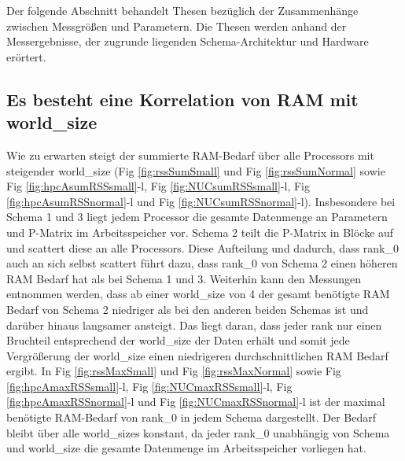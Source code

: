 Der folgende Abschnitt behandelt Thesen bezüglich der Zusammenhänge zwischen Messgrößen und Parametern.
Die Thesen werden anhand der Messergebnisse, der zugrunde liegenden Schema-Architektur und Hardware erörtert.

\subsection{Es besteht eine Korrelation von RAM mit world\_size}

Wie zu erwarten steigt der summierte RAM-Bedarf über alle Processors mit steigender world\_size
(Fig \ref{fig:rssSumSmall} und Fig \ref{fig:rssSumNormal} sowie Fig \ref{fig:hpcAsumRSSsmall}-l, Fig \ref{fig:NUCsumRSSsmall}-l, Fig \ref{fig:hpcAsumRSSnormal}-l und Fig \ref{fig:NUCsumRSSnormal}-l).
Insbesondere bei Schema 1 und 3 liegt jedem Processor
die gesamte Datenmenge an Parametern und P-Matrix im Arbeitsspeicher vor.
Schema 2 teilt die P-Matrix in Blöcke auf und scattert diese an alle Processors.
Diese Aufteilung und dadurch, dass rank\_0 auch an sich selbst
scattert führt dazu, dass rank\_0 von Schema 2 einen höheren RAM Bedarf hat als bei Schema 1 und 3.
Weiterhin kann den Messungen entnommen werden,
dass ab einer world\_size von 4 der gesamt benötigte RAM Bedarf von Schema 2 niedriger als bei den anderen beiden Schemas ist und darüber
hinaus langsamer ansteigt.
Das liegt daran, dass jeder rank nur einen Bruchteil entsprechend der world\_size der Daten erhält und somit jede Vergrößerung der
world\_size einen niedrigeren durchschnittlichen RAM Bedarf ergibt.
In Fig \ref{fig:rssMaxSmall} und Fig \ref{fig:rssMaxNormal} sowie Fig \ref{fig:hpcAmaxRSSsmall}-l, Fig \ref{fig:NUCmaxRSSsmall}-l, Fig \ref{fig:hpcAmaxRSSnormal}-l und Fig \ref{fig:NUCmaxRSSnormal}-l
ist der maximal benötigte RAM-Bedarf von rank\_0 in jedem Schema dargestellt.
Der Bedarf bleibt über alle world\_sizes konstant, da jeder rank\_0
unabhängig von Schema und world\_size die gesamte Datenmenge im Arbeitsspeicher vorliegen hat.

